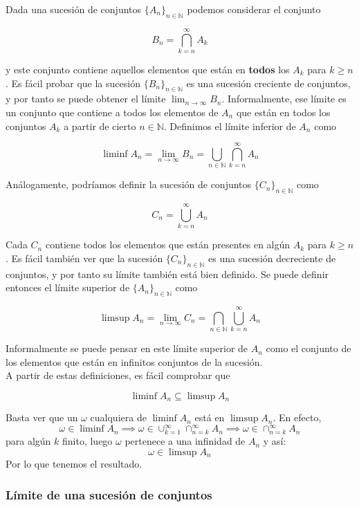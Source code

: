 Dada una sucesión de conjuntos $\{A_n\}_{n\in\mathbb{N} }$ podemos considerar el conjunto

$$ B_n = \bigcap_{k=n}^{\infty} A_k $$

y este conjunto contiene aquellos elementos que están en \textbf{todos} los $A_k$ para $k \geq n$. Es fácil probar que la sucesión $\{B_n\}_{n\in\mathbb{N}}$ es una sucesión creciente de conjuntos, y por tanto se puede obtener el límite $\lim_{n\to\infty} B_n$. Informalmente, ese límite es un conjunto que contiene a todos los elementos de $A_n$ que están en todos los conjuntos $A_k$ a partir de cierto $n\in\mathbb{N}$. Definimos el límite inferior de $A_n$ como

$$ \liminf A_n = \lim_{n\to\infty} B_n = \bigcup_{n\in\mathbb{N}} \bigcap_{k=n}^{\infty} A_n $$

Análogamente, podríamos definir la sucesión de conjuntos $\{C_n\}_{n\in\mathbb{N}}$ como

$$ C_n = \bigcup_{k=n}^{\infty} A_n $$

Cada $C_n$ contiene todos los elementos que están presentes en algún $A_k$ para $k \geq n$. Es fácil también ver que la sucesión $\{C_n\}_{n\in\mathbb{N}}$ es una sucesión decreciente de conjuntos, y por tanto su límite también está bien definido. Se puede definir entonces el límite superior de $\{A_n\}_{n\in\mathbb{N}}$ como

$$ \limsup A_n = \lim_{n\to\infty} C_n = \bigcap_{n\in\mathbb{N}} \bigcup_{k=n}^{\infty} A_n $$

Informalmente se puede pensar en este límite superior de $A_n$ como el conjunto de los elementos que están en infinitos conjuntos de la sucesión.\\

A partir de estas definiciones, es fácil comprobar que

$$ \liminf A_n \subseteq \limsup A_n $$

Basta ver que un $\omega$ cualquiera de $\liminf A_n$ está en $\limsup A_n$. En efecto,
\[
\omega \in \liminf A_n \implies \omega \in \cup_{k=1}^\infty \cap_{n=k}^\infty A_n \implies \omega \in \cap_{n=k}^\infty A_n
\]
para algún $k$ finito, luego $\omega$ pertenece a una infinidad de $A_n$ y así:
\[
\omega \in \limsup A_n 
\]
Por lo que tenemos el resultado.

\subsubsection{Límite de una sucesión de conjuntos}

